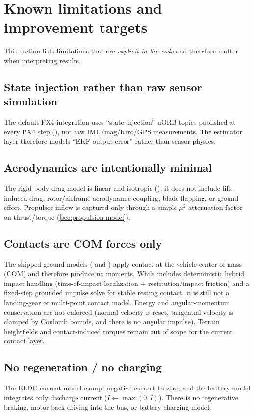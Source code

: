 \section{Known limitations and improvement targets}
\label{sec:limitations}

This section lists limitations that are \emph{explicit in the code} and therefore matter when interpreting results.

\subsection{State injection rather than raw sensor simulation}
The default PX4 integration uses ``state injection'' uORB topics published at every PX4 step (), not raw IMU/mag/baro/GPS measurements. The estimator layer therefore models ``EKF output error'' rather than sensor physics.

\subsection{Aerodynamics are intentionally minimal}
The rigid-body drag model is linear and isotropic (); it does not include lift, induced drag, rotor/airframe aerodynamic coupling, blade flapping, or ground effect. Propulsor inflow is captured only through a simple $\mu^2$ attenuation factor on thrust/torque (\cref{sec:propulsion-model}).

\subsection{Contacts are COM forces only}
The shipped ground models ( and ) apply contact at the vehicle center of mass (COM) and therefore produce no moments. While  includes deterministic hybrid impact handling (time-of-impact localization + restitution/impact friction) and a fixed-step grounded impulse solve for stable resting contact, it is still not a landing-gear or multi-point contact model. Energy and angular-momentum conservation are not enforced (normal velocity is reset, tangential velocity is clamped by Coulomb bounds, and there is no angular impulse). Terrain heightfields and contact-induced torques remain out of scope for the current contact layer.

\subsection{No regeneration / no charging}
The BLDC current model clamps negative current to zero, and the battery model integrates only discharge current ($I\gets\max(0,I)$). There is no regenerative braking, motor back-driving into the bus, or battery charging model.

